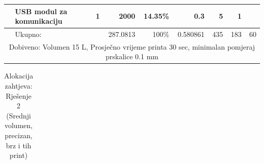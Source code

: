 \documentclass[12pt]{article}
\begin{document}
\begin{landscape}
\begin{table}[]
\begin{tabular}{ccccccccc}
\cmidrule{5-5}          & \multicolumn{1}{l}{USB modul za komunikaciju} & \multicolumn{1}{r}{1} & \multicolumn{1}{r}{2000} & \multicolumn{1}{r}{14.35\%} & \multicolumn{1}{r}{0.3} & \multicolumn{1}{r}{5} & \multicolumn{1}{r}{1} &  \\
    \midrule
          & \multicolumn{1}{l}{Ukupno:} &       & \multicolumn{1}{r}{287.0813} & \multicolumn{1}{r}{100\%} & \multicolumn{1}{r}{0.580861} & \multicolumn{1}{r}{435} & \multicolumn{1}{r}{183} & \multicolumn{1}{r}{60} \\
    \midrule
    \multicolumn{9}{c}{Dobiveno: Volumen 15 L, Prosječno vrijeme printa 30 sec, minimalan pomjeraj prskalice 0.1 mm} \\
    \bottomrule
    \end{tabular}%
  \label{tab:rjesenje1}%
\end{table}%

\begin{table}[htbp]
    \scriptsize
  \centering
  \caption{Alokacija zahtjeva: Rješenje 2 (Srednji volumen, precizan, brz i tih print)}
    \begin{tabular}{ccccccccc}


\end{tabular}
\end{table}
\end{landscape}
\end{document}
